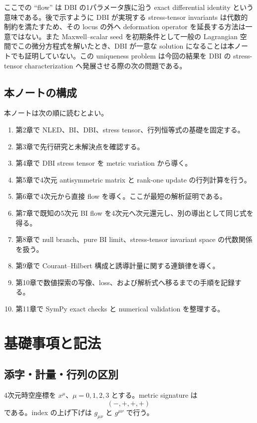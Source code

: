 \documentclass[a4paper,11pt]{ltjsreport}
\begin{document}
ここでの ``flow'' は DBI の1パラメータ族に沿う exact differential identity という意味である。後で示すように DBI が実現する stress-tensor invariants は代数的制約を満たすため、その locus の外へ deformation operator を延長する方法は一意ではない。また Maxwell--scalar seed を初期条件として一般の Lagrangian 空間でこの微分方程式を解いたとき、DBI が一意な solution になることは本ノートでも証明していない。この uniqueness problem は今回の結果を DBI の stress-tensor characterization へ発展させる際の次の問題である。

\section{本ノートの構成}

本ノートは次の順に読むとよい。
\begin{enumerate}[label=\arabic*.]
 \item 第2章で NLED、BI、DBI、stress tensor、行列恒等式の基礎を固定する。
 \item 第3章で先行研究と未解決点を確認する。
 \item 第4章で DBI stress tensor を metric variation から導く。
 \item 第5章で4次元 antisymmetric matrix と rank-one update の行列計算を行う。
 \item 第6章で4次元から直接 flow を導く。ここが最短の解析証明である。
 \item 第7章で既知の5次元 BI flow を4次元へ次元還元し、別の導出として同じ式を得る。
 \item 第8章で null branch、pure BI limit、stress-tensor invariant space の代数関係を扱う。
 \item 第9章で Courant--Hilbert 構成と誘導計量に関する連鎖律を導く。
 \item 第10章で数値探索の写像、loss、および解析式へ移るまでの手順を記録する。
 \item 第11章で SymPy exact checks と numerical validation を整理する。
\end{enumerate}

\chapter{基礎事項と記法}

\section{添字・計量・行列の区別}

4次元時空座標を $x^\mu$、$\mu=0,1,2,3$ とする。metric signature は
\begin{equation}
 (-,+,+,+)
\end{equation}
である。index の上げ下げは $g_{\mu\nu}$ と $g^{\mu\nu}$ で行う。
\end{document}
